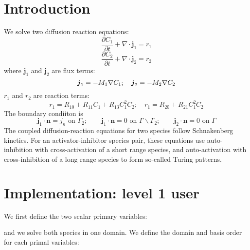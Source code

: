 \hypertarget{growth_Introduction}{}\section{Introduction}\label{growth_Introduction}
We solve two diffusion reaction equations\+: \[ \frac{\partial C_\text{1}}{\partial t}+\nabla\cdot\boldsymbol{j}_1=r_1 \] \[ \frac{\partial C_\text{2}}{\partial t}+\nabla\cdot\boldsymbol{j}_2=r_2 \] where $\boldsymbol{j}_1 $ and $\boldsymbol{j}_2 $ are flux terms\+: \[ \boldsymbol{j}_1=-M_1\nabla C_\text{1}; \quad \boldsymbol{j}_2=-M_2\nabla C_\text{2}\\ \] $r_1$ and $r_2$ are reaction terms\+: \[ r_1= R_{10}+R_{11}C_1+R_{13}C_1^2C_2; \quad r_1= R_{20}+R_{21}C_1^2C_2 \] The boundary condiiton is \[ \boldsymbol{j}_1\cdot\boldsymbol{n}=j_n \text{ on }\Gamma_2;\quad \quad \boldsymbol{j}_1\cdot\boldsymbol{n}=0 \text{ on }\Gamma \backslash \Gamma_2; \quad \quad \boldsymbol{j}_2\cdot\boldsymbol{n}=0 \text{ on }\Gamma \] The coupled diffusion-\/reaction equations for two species follow Schnakenberg kinetics. For an activator-\/inhibitor species pair, these equations use auto-\/inhibition with cross-\/activation of a short range species, and auto-\/activation with cross-\/inhibition of a long range species to form so-\/called Turing patterns.\hypertarget{growth_imple}{}\section{Implementation\+: level 1 user}\label{growth_imple}
We first define the two scalar primary variables\+: 
\begin{DoxyCode}{0}
\end{DoxyCode}
 and we solve both species in one domain. We define the domain and basis order for each primal variables\+: 
\begin{DoxyCode}{0}
\end{DoxyCode}
